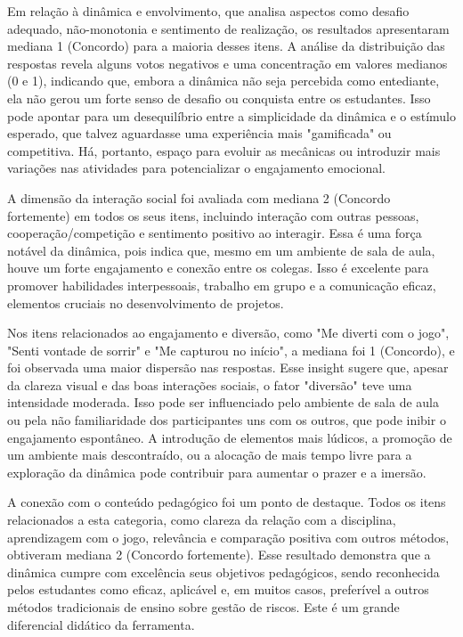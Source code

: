 \documentclass[
	12pt,
	openright,
	twoside,
	a4paper,
	english,
	brazil
	]{abntex2}
\begin{document}
Em relação à dinâmica e envolvimento, que analisa aspectos como desafio adequado, não-monotonia e sentimento de realização, os resultados apresentaram mediana 1 (Concordo) para a maioria desses itens. A análise da distribuição das respostas revela alguns votos negativos e uma concentração em valores medianos (0 e 1), indicando que, embora a dinâmica não seja percebida como entediante, ela não gerou um forte senso de desafio ou conquista entre os estudantes. Isso pode apontar para um desequilíbrio entre a simplicidade da dinâmica e o estímulo esperado, que talvez aguardasse uma experiência mais "gamificada" ou competitiva. Há, portanto, espaço para evoluir as mecânicas ou introduzir mais variações nas atividades para potencializar o engajamento emocional.

A dimensão da interação social foi avaliada com mediana 2 (Concordo fortemente) em todos os seus itens, incluindo interação com outras pessoas, cooperação/competição e sentimento positivo ao interagir. Essa é uma força notável da dinâmica, pois indica que, mesmo em um ambiente de sala de aula, houve um forte engajamento e conexão entre os colegas. Isso é excelente para promover habilidades interpessoais, trabalho em grupo e a comunicação eficaz, elementos cruciais no desenvolvimento de projetos.

Nos itens relacionados ao engajamento e diversão, como "Me diverti com o jogo", "Senti vontade de sorrir" e "Me capturou no início", a mediana foi 1 (Concordo), e foi observada uma maior dispersão nas respostas. Esse insight sugere que, apesar da clareza visual e das boas interações sociais, o fator "diversão" teve uma intensidade moderada. Isso pode ser influenciado pelo ambiente de sala de aula ou pela não familiaridade dos participantes uns com os outros, que pode inibir o engajamento espontâneo. A introdução de elementos mais lúdicos, a promoção de um ambiente mais descontraído, ou a alocação de mais tempo livre para a exploração da dinâmica pode contribuir para aumentar o prazer e a imersão.

A conexão com o conteúdo pedagógico foi um ponto de destaque. Todos os itens relacionados a esta categoria, como clareza da relação com a disciplina, aprendizagem com o jogo, relevância e comparação positiva com outros métodos, obtiveram mediana 2 (Concordo fortemente). Esse resultado demonstra que a dinâmica cumpre com excelência seus objetivos pedagógicos, sendo reconhecida pelos estudantes como eficaz, aplicável e, em muitos casos, preferível a outros métodos tradicionais de ensino sobre gestão de riscos. Este é um grande diferencial didático da ferramenta.
\end{document}
